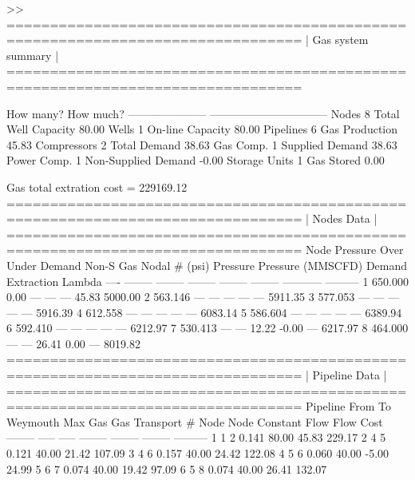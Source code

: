 \begin{small}
\begin{Code}
    >>  ================================================================================
	|     Gas system summary                                                       |
	================================================================================
	
	How many?                  How much?              
	---------------------    -------------------------------- 
	Nodes            8         Total Well Capacity    80.00 
	Wells            1         On-line Capacity       80.00
	Pipelines        6         Gas Production         45.83
	Compressors      2         Total Demand           38.63
	Gas Comp.        1           Supplied Demand      38.63
	Power Comp.      1           Non-Supplied Demand  -0.00
	Storage Units    1         Gas Stored              0.00
	
	Gas total extration cost =   229169.12
	================================================================================
	|     Nodes Data                                                               |
	================================================================================
	Node   Pressure     Over      Under    Demand     Non-S      Gas         Nodal   
	  #      (psi)    Pressure  Pressure  (MMSCFD)   Demand   Extraction    Lambda  
	----   --------  --------  --------  --------  --------  -----------  ---------
	  1     650.000     0.00      ---       ---       ---        45.83      5000.00 
	  2     563.146     ---       ---       ---       ---         ---       5911.35 
	  3     577.053     ---       ---       ---       ---         ---       5916.39 
	  4     612.558     ---       ---       ---       ---         ---       6083.14 
	  5     586.604     ---       ---       ---       ---         ---       6389.94 
	  6     592.410     ---       ---       ---       ---         ---       6212.97 
	  7     530.413     ---       ---      12.22     -0.00        ---       6217.97 
	  8     464.000     ---       ---      26.41      0.00        ---       8019.82
	================================================================================
	|     Pipeline Data                                                            |
	================================================================================
	Pipeline    From      To      Weymouth    Max Gas       Gas       Transport
	   #        Node     Node     Constant     Flow         Flow        Cost    
	--------    -----    -----    --------    --------    --------    ---------
	   1          1        2        0.141       80.00       45.83       229.17 
	   2          4        5        0.121       40.00       21.42       107.09 
	   3          4        6        0.157       40.00       24.42       122.08 
	   4          5        6        0.060       40.00       -5.00        24.99 
	   5          6        7        0.074       40.00       19.42        97.09 
	   6          5        8        0.074       40.00       26.41       132.07 	 
\end{Code}
\end{small}


